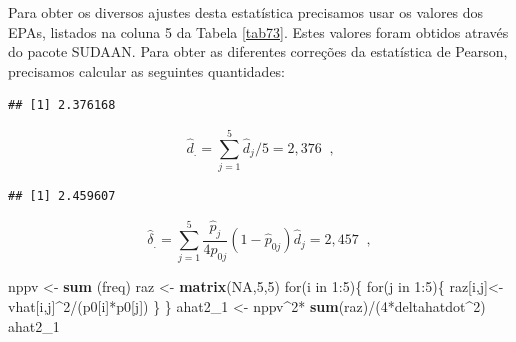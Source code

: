 \documentclass[]{book}
\newenvironment{Shaded}{\begin{snugshade}}{\end{snugshade}}
\newcommand{\KeywordTok}[1]{\textcolor[rgb]{0.13,0.29,0.53}{\textbf{{#1}}}}
\newcommand{\DecValTok}[1]{\textcolor[rgb]{0.00,0.00,0.81}{{#1}}}
\newcommand{\StringTok}[1]{\textcolor[rgb]{0.31,0.60,0.02}{{#1}}}
\newcommand{\OtherTok}[1]{\textcolor[rgb]{0.56,0.35,0.01}{{#1}}}
\newcommand{\NormalTok}[1]{{#1}}
\numberwithin{example}{chapter}
\numberwithin{remark}{chapter}
\numberwithin{definition}{chapter}
\begin{document}
Para obter os diversos ajustes desta estatística precisamos usar os
valores dos EPAs, listados na coluna 5 da Tabela \ref{tab73}. Estes
valores foram obtidos através do pacote SUDAAN. Para obter as diferentes
correções da estatística de Pearson, precisamos calcular as seguintes
quantidades:

\begin{Shaded}
\end{Shaded}

\begin{verbatim}
## [1] 2.376168
\end{verbatim}

\[
\hat{d}_{.}=\sum_{j=1}^{5}\hat{d}_{j}/5=2,376\;\;\mbox{,} 
\]

\begin{Shaded}
\end{Shaded}

\begin{verbatim}
## [1] 2.459607
\end{verbatim}

\[
\hat{\delta}_{.}=\sum_{j=1}^5\frac{\hat{p}_{j}}{4p_{0j}}
\left( 1-\hat{p}_{0j}\right) \hat{d}_{j}=2,457\;\;, 
\]

\begin{Shaded}
\begin{Highlighting}[]
\NormalTok{nppv <-}\StringTok{ }\KeywordTok{sum} \NormalTok{(freq)}
\NormalTok{raz <-}\StringTok{ }\KeywordTok{matrix}\NormalTok{(}\OtherTok{NA}\NormalTok{,}\DecValTok{5}\NormalTok{,}\DecValTok{5}\NormalTok{)}
\NormalTok{for(i in }\DecValTok{1}\NormalTok{:}\DecValTok{5}\NormalTok{)\{}
  \NormalTok{for(j in }\DecValTok{1}\NormalTok{:}\DecValTok{5}\NormalTok{)\{}
    \NormalTok{raz[i,j]<-}\StringTok{ }\NormalTok{vhat[i,j]^}\DecValTok{2}\NormalTok{/(p0[i]*p0[j])}
  \NormalTok{\}}
\NormalTok{\}}
\NormalTok{ahat2_1 <-}\StringTok{ }\NormalTok{nppv^}\DecValTok{2}\NormalTok{*}\StringTok{ }\KeywordTok{sum}\NormalTok{(raz)/(}\DecValTok{4}\NormalTok{*deltahatdot^}\DecValTok{2}\NormalTok{)}
\NormalTok{ahat2_1}
\end{Highlighting}
\end{Shaded}
\end{document}
